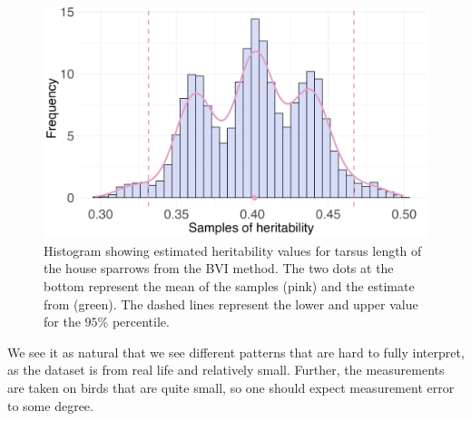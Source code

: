 \begin{figure}[H]%
  \centering
  \includegraphics[width=1\linewidth]{Figures/House sparrow study/Heritability_tarsus.png}
  \caption{Histogram showing estimated heritability values for tarsus length of the house sparrows from the BVI method. The two dots at the bottom represent the mean of the samples (pink) and the estimate from \citep{Silva2017} (green). The dashed lines represent the lower and upper value for the $95\%$ percentile.}
  \label{fig:heritability_tarsus}
\end{figure}
\noindent We see it as natural that we see different patterns that are hard to fully interpret, as the dataset is from real life and relatively small. Further, the measurements are taken on birds that are quite small, so one should expect measurement error to some degree.
  



